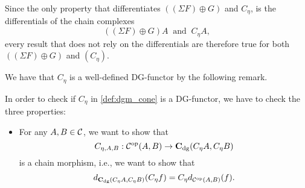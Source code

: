 \begin{remark}
    \label{rem:dgm_c_eta_similar_to_sigma_f_plus_g}
    Since the only property that differentiates \( ((\Sigma F) \oplus G) \) and \( C_{\eta} \), is the differentials of the chain complexes
    \[
        ((\Sigma F) \oplus G) A \: \text{ and } \: C_{\eta} A,
    \]
    every result that does not rely on the differentials are therefore true for both \( ((\Sigma F) \oplus G)\) and \( (C_{\eta}) \).
\end{remark}

We have that \( C_{\eta} \) is a well-defined DG-functor by the following remark.
\begin{remark}
    In order to check if \( C_{\eta} \) in \autoref{def:dgm_cone} is a DG-functor, we have to check the three properties:
    \begin{itemize}
        \item {
            For any \( A, B \in {\mathcal{C}} \), we want to show that
            \[
                C_{\eta, A, B}: {\mathcal{C}}^{\operatorname{op}}(A, B) \to \operatorname{\mathbf{C}}_{\operatorname{dg}}(C_{\eta} A, C_{\eta} B)
            \]
            is a chain morphism, i.e., we want to show that
            \[
                d_{\operatorname{\mathbf{C}}_{\operatorname{dg}}(C_{\eta} A, C_{\eta} B)}(C_{\eta} f) = C_{\eta} d_{{\mathcal{C}}^{\operatorname{op}}(A, B)}(f).
            \]

}
\end{itemize}
\end{remark}
